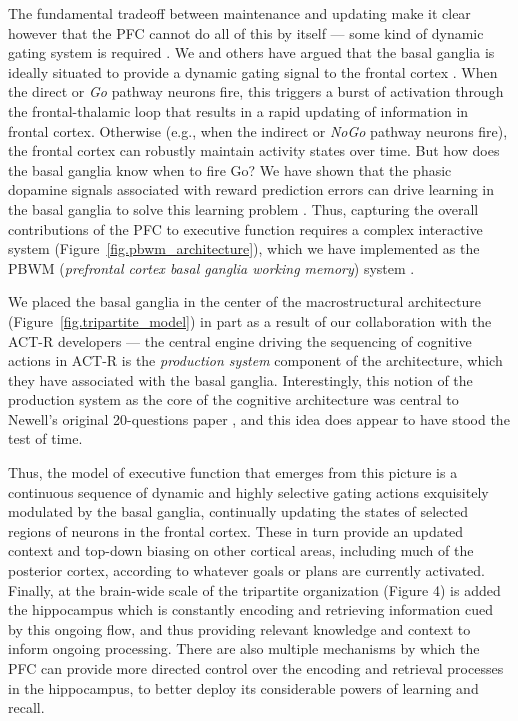 \documentclass[11pt,twoside]{article}
\begin{document}
The fundamental tradeoff between maintenance and updating make it
clear however that the PFC cannot do all of this by itself --- some
kind of dynamic gating system is required \cite{OReillyBraverCohen99}.
We and others have argued that the basal ganglia is ideally situated
to provide a dynamic gating signal to the frontal cortex \cite[e.g.,
]{FrankLoughryOReilly01}.  When the direct or {\em Go} pathway neurons
fire, this triggers a burst of activation through the frontal-thalamic
loop that results in a rapid updating of information in frontal
cortex.  Otherwise (e.g., when the indirect or {\em NoGo} pathway
neurons fire), the frontal cortex can robustly maintain activity
states over time.  But how does the basal ganglia know when to fire
Go?  We have shown that the phasic dopamine signals associated with
reward prediction errors can drive learning in the basal ganglia to
solve this learning problem \cite{OReillyFrank06}.  Thus, capturing
the overall contributions of the PFC to executive function requires a
complex interactive system (Figure~\ref{fig.pbwm_architecture}), which
we have implemented as the PBWM ({\em prefrontal cortex basal ganglia
  working memory}) system
\cite{OReillyFrank06,HazyFrankOReilly06,HazyFrankOReilly07,HazyPauliHerdEtAlInPrep}.

We placed the basal ganglia in the center of the macrostructural
architecture (Figure~\ref{fig.tripartite_model}) in part as a result
of our collaboration with the ACT-R developers --- the central engine
driving the sequencing of cognitive actions in ACT-R is the {\em
  production system} component of the architecture, which they have
associated with the basal ganglia.  Interestingly, this notion of the
production system as the core of the cognitive architecture was
central to Newell's original 20-questions paper \cite{Newell73}, and
this idea does appear to have stood the test of time.
 

Thus, the model of executive function that emerges from this picture
is a continuous sequence of dynamic and highly selective gating
actions exquisitely modulated by the basal ganglia, continually
updating the states of selected regions of neurons in the frontal
cortex. These in turn provide an updated context and top-down biasing
on other cortical areas, including much of the posterior cortex,
according to whatever goals or plans are currently activated.
Finally, at the brain-wide scale of the tripartite organization
(Figure 4) is added the hippocampus which is constantly encoding and
retrieving information cued by this ongoing flow, and thus providing
relevant knowledge and context to inform ongoing processing.  There
are also multiple mechanisms by which the PFC can provide more
directed control over the encoding and retrieval processes in the
hippocampus, to better deploy its considerable powers of learning and
recall.
\end{document}
